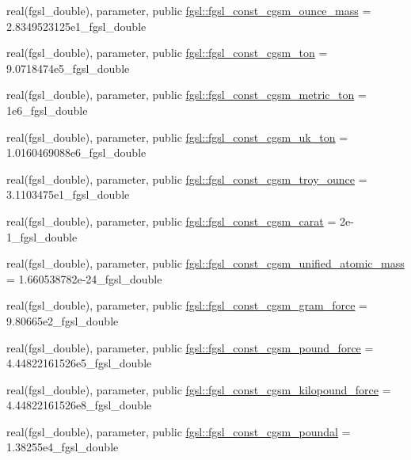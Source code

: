 \begin{DoxyCompactItemize}
\item 
real(fgsl\+\_\+double), parameter, public \hyperlink{namespacefgsl_aef077a68e7fdd2fe6ec932a7f3c1e8bc}{fgsl\+::fgsl\+\_\+const\+\_\+cgsm\+\_\+ounce\+\_\+mass} = 2.\+8349523125e1\+\_\+fgsl\+\_\+double
\item 
real(fgsl\+\_\+double), parameter, public \hyperlink{namespacefgsl_a4f163ec06fee37b45bf96990c803601e}{fgsl\+::fgsl\+\_\+const\+\_\+cgsm\+\_\+ton} = 9.\+0718474e5\+\_\+fgsl\+\_\+double
\item 
real(fgsl\+\_\+double), parameter, public \hyperlink{namespacefgsl_a6d4725a1ee32c2bf1dcd4aa1d2e00908}{fgsl\+::fgsl\+\_\+const\+\_\+cgsm\+\_\+metric\+\_\+ton} = 1e6\+\_\+fgsl\+\_\+double
\item 
real(fgsl\+\_\+double), parameter, public \hyperlink{namespacefgsl_abcaa9958fedcc17e52fb560e58639633}{fgsl\+::fgsl\+\_\+const\+\_\+cgsm\+\_\+uk\+\_\+ton} = 1.\+0160469088e6\+\_\+fgsl\+\_\+double
\item 
real(fgsl\+\_\+double), parameter, public \hyperlink{namespacefgsl_aa2e9facb3d97dfb32697727764bbd619}{fgsl\+::fgsl\+\_\+const\+\_\+cgsm\+\_\+troy\+\_\+ounce} = 3.\+1103475e1\+\_\+fgsl\+\_\+double
\item 
real(fgsl\+\_\+double), parameter, public \hyperlink{namespacefgsl_a239136f12feacdcaf3bc528ccb0c492f}{fgsl\+::fgsl\+\_\+const\+\_\+cgsm\+\_\+carat} = 2e-\/1\+\_\+fgsl\+\_\+double
\item 
real(fgsl\+\_\+double), parameter, public \hyperlink{namespacefgsl_a6b7f3fbb6b2b1c225cab4719706b6d59}{fgsl\+::fgsl\+\_\+const\+\_\+cgsm\+\_\+unified\+\_\+atomic\+\_\+mass} = 1.\+660538782e-\/24\+\_\+fgsl\+\_\+double
\item 
real(fgsl\+\_\+double), parameter, public \hyperlink{namespacefgsl_a1ba32b331b50764a4e448e8020526104}{fgsl\+::fgsl\+\_\+const\+\_\+cgsm\+\_\+gram\+\_\+force} = 9.\+80665e2\+\_\+fgsl\+\_\+double
\item 
real(fgsl\+\_\+double), parameter, public \hyperlink{namespacefgsl_a42219a1cda342fbf61675de1c4fa2e9a}{fgsl\+::fgsl\+\_\+const\+\_\+cgsm\+\_\+pound\+\_\+force} = 4.\+44822161526e5\+\_\+fgsl\+\_\+double
\item 
real(fgsl\+\_\+double), parameter, public \hyperlink{namespacefgsl_aca0248b47e63c840ed0ab430927008f1}{fgsl\+::fgsl\+\_\+const\+\_\+cgsm\+\_\+kilopound\+\_\+force} = 4.\+44822161526e8\+\_\+fgsl\+\_\+double
\item 
real(fgsl\+\_\+double), parameter, public \hyperlink{namespacefgsl_a4453ec263f2b4c5802122e762e1672c4}{fgsl\+::fgsl\+\_\+const\+\_\+cgsm\+\_\+poundal} = 1.\+38255e4\+\_\+fgsl\+\_\+double

\end{DoxyCompactItemize}
